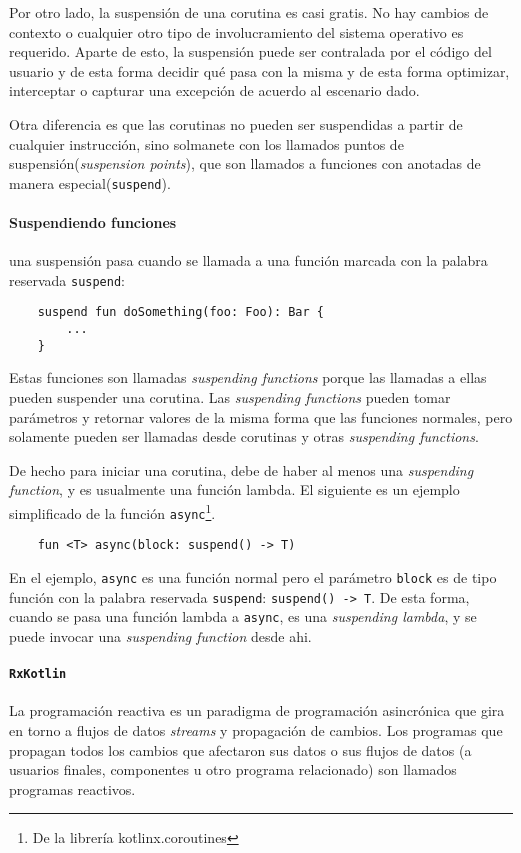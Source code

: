 Por otro lado, la suspensión de una corutina es casi gratis. No hay cambios de contexto o cualquier otro tipo de involucramiento del sistema operativo es requerido. Aparte de esto, la suspensión puede ser contralada por el código del usuario y de esta forma decidir qué pasa con la misma y de esta forma optimizar, interceptar o capturar una excepción de acuerdo al escenario dado.

Otra diferencia es que las corutinas no pueden ser suspendidas a partir de cualquier instrucción, sino solmanete con los llamados puntos de suspensión(\emph{suspension points}), que son llamados a funciones con anotadas de manera especial(\texttt{suspend}).

\paragraph{Suspendiendo funciones} una suspensión pasa cuando se llamada a una función marcada con la palabra reservada \texttt{suspend}:
\begin{verbatim}
    suspend fun doSomething(foo: Foo): Bar {
        ...
    }
\end{verbatim}
Estas funciones son llamadas \emph{suspending functions} porque las llamadas a ellas pueden suspender una corutina. Las \emph{suspending functions} pueden tomar parámetros y retornar valores de la misma forma que las funciones normales, pero solamente pueden ser llamadas desde corutinas y otras \emph{suspending functions}.

De hecho para iniciar una corutina, debe de haber al menos una \emph{suspending function}, y es usualmente una función lambda. El siguiente es un ejemplo simplificado de la función \texttt{async}\footnote{De la librería kotlinx.coroutines}.
\begin{verbatim}
    fun <T> async(block: suspend() -> T)
\end{verbatim}
En el ejemplo, \texttt{async} es una función normal pero el parámetro \texttt{block} es de tipo función con la palabra reservada \texttt{suspend}: \texttt{suspend() -> T}. De esta forma, cuando se pasa una función lambda a \texttt{async}, es una \emph{suspending lambda}, y se puede invocar una \emph{suspending function} desde ahi.

\paragraph{\texttt{RxKotlin}\cite{rxkotlin}} La programación reactiva es un paradigma de programación asincrónica que gira en torno a flujos de datos \emph{streams} y propagación de cambios. Los programas que propagan todos los cambios que afectaron sus datos o sus flujos de datos (a usuarios finales, componentes u otro programa relacionado) son llamados programas reactivos.

